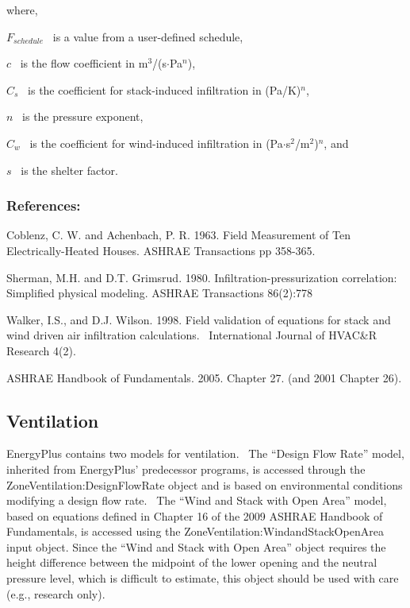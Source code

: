 where,

\({F_{schedule}}\) ~is a value from a user-defined schedule,

\(c\) ~is the flow coefficient in m\(^{3}\)/(s$\cdot$Pa\(^{n}\)),

\({C_s}\) ~is the coefficient for stack-induced infiltration in (Pa/K)\(^{n}\),

\(n\) ~is the pressure exponent,

\({C_w}\) ~is the coefficient for wind-induced infiltration in (Pa$\cdot$s\(^{2}\)/m\(^{2}\))\(^{n}\), and

\(s\) ~is the shelter factor.

\subsubsection{References:}\label{references-031}

Coblenz, C. W. and Achenbach, P. R. 1963. Field Measurement of Ten Electrically-Heated Houses. ASHRAE Transactions pp 358-365.

Sherman, M.H. and D.T. Grimsrud. 1980. Infiltration-pressurization correlation: Simplified physical modeling. ASHRAE Transactions 86(2):778

Walker, I.S., and D.J. Wilson. 1998. Field validation of equations for stack and wind driven air infiltration calculations.~ International Journal of HVAC\&R Research 4(2).

ASHRAE Handbook of Fundamentals. 2005. Chapter 27. (and 2001 Chapter 26).

\subsection{Ventilation}\label{ventilation}

EnergyPlus contains two models for ventilation.~ The ``Design Flow Rate'' model, inherited from EnergyPlus' predecessor programs, is accessed through the ZoneVentilation:DesignFlowRate object and is based on environmental conditions modifying a design flow rate.~ The ``Wind and Stack with Open Area'' model, based on equations defined in Chapter 16 of the 2009 ASHRAE Handbook of Fundamentals, is accessed using the ZoneVentilation:WindandStackOpenArea input object. Since the ``Wind and Stack with Open Area'' object requires the height difference between the midpoint of the lower opening and the neutral pressure level, which is difficult to estimate, this object should be used with care (e.g., research only).

